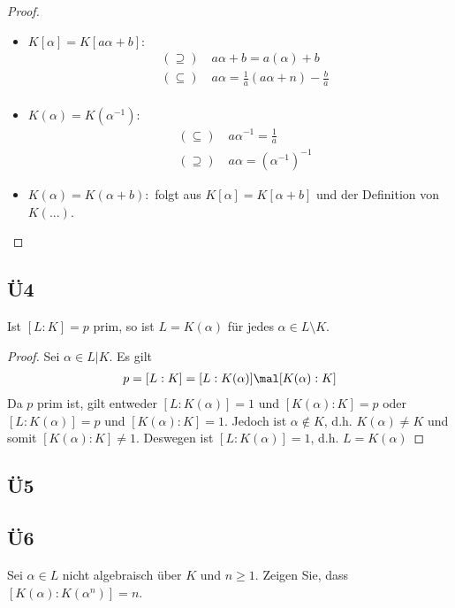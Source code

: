 \begin{proof}
	\begin{itemize}
		\item $K[\alpha] = K[a\alpha + b]:$
		\begin{align*}
			&(\supseteq)\quad a\alpha + b = a(\alpha) + b\\
			&(\subseteq)\quad a\alpha = \frac{1}{a} (a\alpha + n) - \frac{b}{a}\\
		\end{align*}
		\item $K(\alpha) = K(\alpha^{-1}):$
		\begin{align*}
			&(\subseteq)\quad a\alpha^{-1} = \frac{1}{a}\\
			&(\supseteq)\quad a\alpha = (\alpha^{-1})^{-1}
		\end{align*}
		\item $K(\alpha) = K(\alpha +b):$ folgt aus $K[\alpha] = K[\alpha + b]$ und der Definition von $K(...)$. 
	\end{itemize}
\end{proof}

\subsection{Ü4}
Ist $[L:K] = p$ prim, so ist $L = K(\alpha)$ für jedes $\alpha \in L \setminus K$.

\begin{proof}
	Sei $\alpha \in L \vert K$. Es gilt
	\begin{align*}
		p = [L:K] = [L:K(\alpha)]\mal [K(\alpha):K]
	\end{align*}
	Da $p$ prim ist, gilt entweder $[L:K(\alpha)] = 1$ und $[K(\alpha):K] = p$ oder $[L:K(\alpha)]=p$ und $[K(\alpha):K] = 1$. Jedoch ist $\alpha \not\in K$, d.h. $K(\alpha) \neq K$ und somit $[K(\alpha):K] \neq 1$. Deswegen ist $[L:K(\alpha)] = 1$, d.h. $L = K(\alpha)$
\end{proof}


\subsection{Ü5}



\subsection{Ü6}
Sei $\alpha \in L$ nicht algebraisch über $K$ und $n \ge 1$. Zeigen Sie, dass $[K(\alpha):K(\alpha^n)] = n$.

